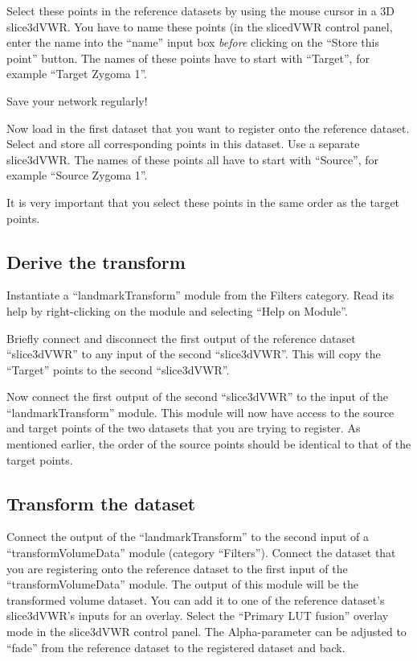 Select these points in the reference datasets by using the mouse
cursor in a 3D slice3dVWR.  You have to name these points (in the
slicedVWR control panel, enter the name into the ``name'' input box
{\em before} clicking on the ``Store this point'' button.  The names
of these points have to start with ``Target'', for example ``Target
Zygoma 1''.

Save your network regularly!

Now load in the first dataset that you want to register onto the
reference dataset.  Select and store all corresponding points in this
dataset.  Use a separate slice3dVWR.  The names of these points all
have to start with ``Source'', for example ``Source Zygoma 1''.

It is very important that you select these points in the same order as
the target points.

\subsection{Derive the transform}
Instantiate a ``landmarkTransform'' module from the Filters category.
Read its help by right-clicking on the module and selecting ``Help on
Module''.

Briefly connect and disconnect the first output of the reference
dataset ``slice3dVWR'' to any input of the second ``slice3dVWR''.
This will copy the ``Target'' points to the second ``slice3dVWR''.

Now connect the first output of the second ``slice3dVWR'' to the input
of the ``landmarkTransform'' module.  This module will now have access
to the source and target points of the two datasets that you are
trying to register.  As mentioned earlier, the order of the source
points should be identical to that of the target points.

\subsection{Transform the dataset}
Connect the output of the ``landmarkTransform'' to the second input of
a ``transformVolumeData'' module (category ``Filters'').  Connect the
dataset that you are registering onto the reference dataset to the
first input of the ``transformVolumeData'' module.  The output of this
module will be the transformed volume dataset.  You can add it to one
of the reference dataset's slice3dVWR's inputs for an overlay.  Select
the ``Primary LUT fusion'' overlay mode in the slice3dVWR control
panel.  The Alpha-parameter can be adjusted to ``fade'' from the
reference dataset to the registered dataset and back.


